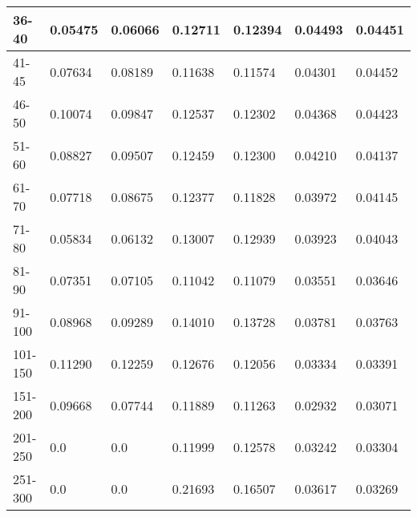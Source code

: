 \begin{table*}[h!]
\begin{tabular}{|l|l|l||l|l||l|l|}
        36-40    & 0.05475                                 & 0.06066                        & 0.12711                          & 0.12394          & 0.04493       & 0.04451          \\ \hline
        41-45    & 0.07634                                 & 0.08189                        & 0.11638                          & 0.11574          & 0.04301       & 0.04452          \\ \hline
        46-50    & 0.10074                                 & 0.09847                        & 0.12537                          & 0.12302          & 0.04368       & 0.04423          \\ \hline
        51-60    & 0.08827                                 & 0.09507                        & 0.12459                          & 0.12300          & 0.04210       & 0.04137          \\ \hline
        61-70    & 0.07718                                 & 0.08675                        & 0.12377                          & 0.11828          & 0.03972       & 0.04145          \\ \hline
        71-80    & 0.05834                                 & 0.06132                        & 0.13007                          & 0.12939          & 0.03923       & 0.04043          \\ \hline
        81-90    & 0.07351                                 & 0.07105                        & 0.11042                          & 0.11079          & 0.03551       & 0.03646          \\ \hline
        91-100   & 0.08968                                 & 0.09289                        & 0.14010                          & 0.13728          & 0.03781       & 0.03763          \\ \hline
        101-150  & 0.11290                                 & 0.12259                        & 0.12676                          & 0.12056          & 0.03334       & 0.03391          \\ \hline
        151-200  & 0.09668                                 & 0.07744                        & 0.11889                          & 0.11263          & 0.02932       & 0.03071          \\ \hline
        201-250  & 0.0                                     & 0.0                            & 0.11999                          & 0.12578          & 0.03242       & 0.03304          \\ \hline
        251-300  & 0.0                                     & 0.0                            & 0.21693                          & 0.16507          & 0.03617       & 0.03269          \\ \hline

\end{tabular}
\end{table*}
